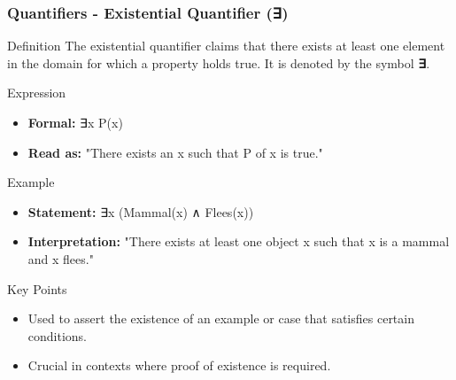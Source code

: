 \documentclass[aspectratio=169]{beamer}
\begin{document}
\begin{frame}[fragile]
    \frametitle{Quantifiers - Existential Quantifier (∃)}
    \begin{block}{Definition}
        The existential quantifier claims that there exists at least one element in the domain for which a property holds true. It is denoted by the symbol \textbf{∃}.
    \end{block}

    \begin{block}{Expression}
        \begin{itemize}
            \item \textbf{Formal:} ∃x P(x)
            \item \textbf{Read as:} "There exists an x such that P of x is true."
        \end{itemize}
    \end{block}

    \begin{block}{Example}
        \begin{itemize}
            \item \textbf{Statement:} ∃x (Mammal(x) ∧ Flees(x))
            \item \textbf{Interpretation:} "There exists at least one object x such that x is a mammal and x flees."
        \end{itemize}
    \end{block}

    \begin{block}{Key Points}
        \begin{itemize}
            \item Used to assert the existence of an example or case that satisfies certain conditions.
            \item Crucial in contexts where proof of existence is required.
        \end{itemize}
    \end{block}
\end{frame}
\end{document}
